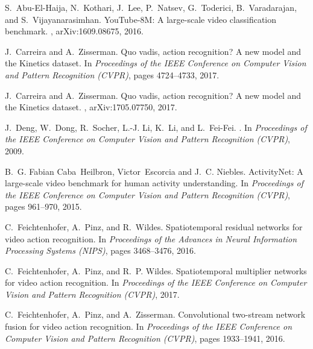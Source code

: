 \documentclass[10pt,twocolumn,letterpaper]{article}
\begin{document}
{\small

\begin{thebibliography}{10}\itemsep=-1pt

  S.~Abu{-}El{-}Haija, N.~Kothari, J.~Lee, P.~Natsev, G.~Toderici,
    B.~Varadarajan, and S.~Vijayanarasimhan.
  \newblock You{T}ube-8{M}: {A} large-scale video classification benchmark.
  , arXiv:1609.08675, 2016.
  
  J.~Carreira and A.~Zisserman.
  \newblock Quo vadis, action recognition? {A} new model and the {K}inetics
    dataset.
  \newblock In {\em Proceedings of the {IEEE} Conference on Computer Vision and
    Pattern Recognition (CVPR)}, pages 4724--4733, 2017.
  
  J.~Carreira and A.~Zisserman.
  \newblock Quo vadis, action recognition? {A} new model and the {K}inetics
    dataset.
  , arXiv:1705.07750, 2017.
  
  J.~Deng, W.~Dong, R.~Socher, L.-J. Li, K.~Li, and L.~Fei-Fei.
  .
  \newblock In {\em Proceedings of the {IEEE} Conference on Computer Vision and
    Pattern Recognition (CVPR)}, 2009.
  
  B.~G. Fabian Caba~Heilbron, Victor~Escorcia and J.~C. Niebles.
  \newblock Activity{N}et: A large-scale video benchmark for human activity
    understanding.
  \newblock In {\em Proceedings of the {IEEE} Conference on Computer Vision and
    Pattern Recognition (CVPR)}, pages 961--970, 2015.
  
  C.~Feichtenhofer, A.~Pinz, and R.~Wildes.
  \newblock Spatiotemporal residual networks for video action recognition.
  \newblock In {\em Proceedings of the Advances in Neural Information Processing
    Systems (NIPS)}, pages 3468--3476, 2016.
  
  C.~Feichtenhofer, A.~Pinz, and R.~P. Wildes.
  \newblock Spatiotemporal multiplier networks for video action recognition.
  \newblock In {\em Proceedings of the IEEE Conference on Computer Vision and
    Pattern Recognition (CVPR)}, 2017.
  
  C.~Feichtenhofer, A.~Pinz, and A.~Zisserman.
  \newblock Convolutional two-stream network fusion for video action recognition.
  \newblock In {\em Proceedings of the {IEEE} Conference on Computer Vision and
    Pattern Recognition (CVPR)}, pages 1933--1941, 2016.
  

\end{thebibliography}}
\end{document}
